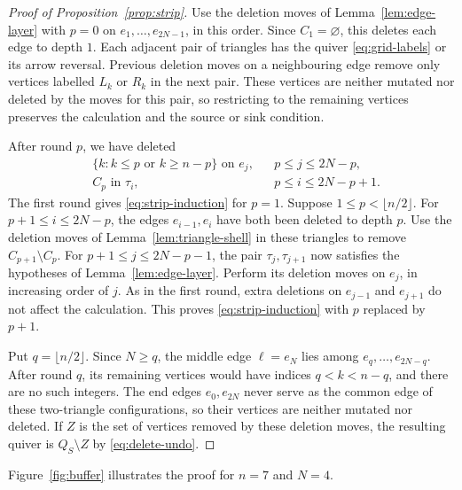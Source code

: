 \documentclass[12pt, letter]{amsart}
\theoremstyle{definition}
\numberwithin{equation}{section}
\begin{document}
\begin{proof}[Proof of Proposition~\ref{prop:strip}]
Use the deletion moves of Lemma~\ref{lem:edge-layer} with $p=0$
on $e_1,\ldots,e_{2N-1}$, in this order.
Since $C_1=\varnothing$, this deletes each edge to depth $1$.
Each adjacent pair of triangles has the quiver
\eqref{eq:grid-labels} or its arrow reversal.
Previous deletion moves on a neighbouring edge remove only vertices
labelled $L_k$ or $R_k$ in the next pair.
These vertices are neither mutated nor deleted by the moves for this pair,
so restricting to the remaining vertices
preserves the calculation and the source or sink condition.

After round $p$, we have deleted
\begin{equation}\label{eq:strip-induction}
 \begin{aligned}
 &\{k:k\le p\text{ or }k\ge n-p\}\text{ on }e_j,
       &&p\le j\le2N-p,\\
 &C_p\text{ in }\tau_i,
       &&p\le i\le2N-p+1.
 \end{aligned}
\end{equation}
The first round gives \eqref{eq:strip-induction} for $p=1$.
Suppose $1\le p<\lfloor n/2\rfloor$.
For $p+1\le i\le2N-p$, the edges $e_{i-1},e_i$ have both
been deleted to depth $p$.
Use the deletion moves of Lemma~\ref{lem:triangle-shell} in these triangles
to remove $C_{p+1}\setminus C_p$.
For $p+1\le j\le2N-p-1$, the pair $\tau_j,\tau_{j+1}$ now
satisfies the hypotheses of Lemma~\ref{lem:edge-layer}.
Perform its deletion moves on $e_j$, in increasing order of $j$.
As in the first round, extra deletions on $e_{j-1}$ and $e_{j+1}$ do
not affect the calculation. This proves \eqref{eq:strip-induction}
with $p$ replaced by $p+1$.

Put $q=\lfloor n/2\rfloor$. Since $N\ge q$, the middle edge
$\ell=e_N$ lies among $e_q,\ldots,e_{2N-q}$.
After round $q$, its remaining vertices would have indices
$q<k<n-q$, and there are no such integers.
The end edges $e_0,e_{2N}$ never serve as the common edge of these
two-triangle configurations, so their vertices are neither mutated nor deleted.
If $Z$ is the set of vertices removed by these deletion moves,
the resulting quiver is $Q_S\setminus Z$ by \eqref{eq:delete-undo}.
\end{proof}

Figure~\ref{fig:buffer} illustrates the proof for $n=7$ and $N=4$.
\end{document}
